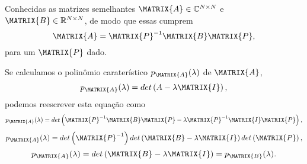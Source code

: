 \begin{myproofT}\label{proof:theo:similhante1}
Conhecidas as matrizes semelhantes $\MATRIX{A} \in \mathbb{C}^{N \times N}$ e $\MATRIX{B} \in \mathbb{R}^{N \times N}$,
de modo que essas cumprem 
\begin{equation}
\MATRIX{A} = \MATRIX{P}^{-1} \MATRIX{B} \MATRIX{P},
\end{equation}
para um $\MATRIX{P}$ dado.

Se calculamos o polinômio caraterístico $p_{\MATRIX{A}}(\lambda)$ de $\MATRIX{A}$,
\begin{equation}
p_{\MATRIX{A}}(\lambda)=det\left(A-\lambda \MATRIX{I}\right),
\end{equation}
podemos reescrever esta equação como
\begin{equation}
p_{\MATRIX{A}}(\lambda)=det\left(\MATRIX{P}^{-1} \MATRIX{B} \MATRIX{P}-\lambda \MATRIX{P}^{-1} \MATRIX{I} \MATRIX{P} \right),
\end{equation}
\begin{equation}
p_{\MATRIX{A}}(\lambda)=det\left( \MATRIX{P}^{-1}\right)det\left( \MATRIX{B} -\lambda \MATRIX{I} \right)det\left( \MATRIX{P}\right),
\end{equation}
\begin{equation}
p_{\MATRIX{A}}(\lambda)=det\left( \MATRIX{B} -\lambda \MATRIX{I} \right) = p_{\MATRIX{B}}(\lambda).
\end{equation}
\end{myproofT}

